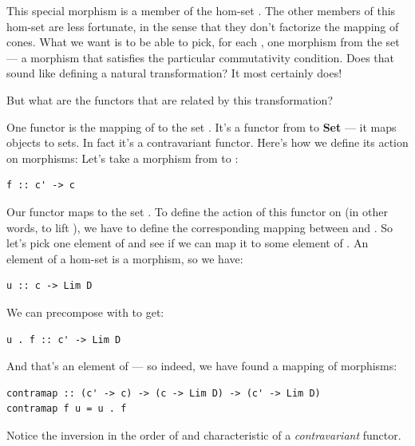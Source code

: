 This special morphism is a member of the hom-set .
The other members of this hom-set are less fortunate, in the sense that
they don't factorize the mapping of cones. What we want is to be able to
pick, for each , one morphism from the set
 --- a morphism that satisfies the particular
commutativity condition. Does that sound like defining a natural
transformation? It most certainly does!

But what are the functors that are related by this transformation?

One functor is the mapping of  to the set
. It's a functor from  to \textbf{Set} ---
it maps objects to sets. In fact it's a contravariant functor. Here's
how we define its action on morphisms: Let's take a morphism 
from  to :

\begin{verbatim}
f :: c' -> c
\end{verbatim}
Our functor maps  to the set
. To define the action of this functor on
 (in other words, to lift ), we have to define the
corresponding mapping between  and
. So let's pick one element  of
 and see if we can map it to some element of
. An element of a hom-set is a morphism, so
we have:

\begin{verbatim}
u :: c -> Lim D
\end{verbatim}
We can precompose  with  to get:

\begin{verbatim}
u . f :: c' -> Lim D
\end{verbatim}
And that's an element of --- so indeed, we
have found a mapping of morphisms:

\begin{verbatim}
contramap :: (c' -> c) -> (c -> Lim D) -> (c' -> Lim D) 
contramap f u = u . f
\end{verbatim}
Notice the inversion in the order of  and 
characteristic of a \emph{contravariant} functor.

\begin{figure}[H]
\centering
{}
\end{figure}

